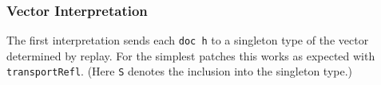 \subsubsection{Vector Interpretation}

The first interpretation sends each \texttt{doc h} to a singleton type of the vector determined
by replay. For the simplest patches this works as expected with \texttt{transportRefl}.
(Here \texttt{S} denotes the inclusion into the singleton type.)

\begin{code}%
%
\>[2]\AgdaFunction{\AgdaUnderscore{}}\AgdaSpace{}%
\AgdaSymbol{:}\AgdaSpace{}%
\AgdaSpace{}%
\AgdaSpace{}%
\AgdaSymbol{(}\AgdaSpace{}%
\AgdaInductiveConstructor{[]}\AgdaSymbol{)}\AgdaSpace{}%
\AgdaSpace{}%
\AgdaSpace{}%
\AgdaSymbol{(}\AgdaSpace{}%
\AgdaSpace{}%
\AgdaInductiveConstructor{[]}\AgdaSymbol{)}\<%
\\
%
\>[2]\AgdaSymbol{\AgdaUnderscore{}}\AgdaSpace{}%
\AgdaSymbol{=}\AgdaSpace{}%
\AgdaSpace{}%
\AgdaSymbol{\AgdaUnderscore{}}\<%
\\
%
\\[\AgdaEmptyExtraSkip]%
%
\>[2]\AgdaFunction{\AgdaUnderscore{}}\AgdaSpace{}%
\AgdaSymbol{:}\AgdaSpace{}%
\AgdaSpace{}%
\AgdaSpace{}%
\AgdaSymbol{(}\AgdaSpace{}%
\AgdaSymbol{(}\AgdaSpace{}%
\AgdaSpace{}%
\AgdaInductiveConstructor{[]}\AgdaSymbol{))}\AgdaSpace{}%
\AgdaSpace{}%
\AgdaSpace{}%
\AgdaInductiveConstructor{[]}\<%
\\
%
\>[2]\AgdaSymbol{\AgdaUnderscore{}}\AgdaSpace{}%
\AgdaSymbol{=}\AgdaSpace{}%
\AgdaSpace{}%
\AgdaSymbol{\AgdaUnderscore{}}\<%
\\
%
\\[\AgdaEmptyExtraSkip]%
%
\>[2]\AgdaFunction{\AgdaUnderscore{}}\AgdaSpace{}%
\AgdaSymbol{:}\AgdaSpace{}%
\AgdaSpace{}%
\AgdaSpace{}%
\AgdaSymbol{(}\AgdaSpace{}%
\AgdaSpace{}%
\AgdaSymbol{(}\AgdaSpace{}%
\AgdaInductiveConstructor{[]}\AgdaSymbol{))}\AgdaSpace{}%
\AgdaSpace{}%
\AgdaSpace{}%
\AgdaInductiveConstructor{[]}\<%
\\

\end{code}
